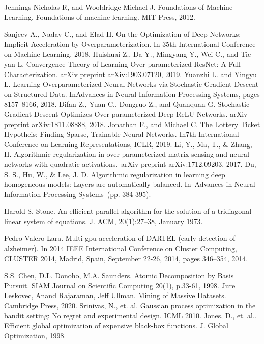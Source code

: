 \begin{thebibliography}{1}
  Jennings Nicholas R, and Wooldridge Michael J. Foundations of Machine Learning. Foundations of machine learning. MIT Press, 2012.

  Sanjeev A., Nadav C., and    Elad H. On the Optimization of Deep Networks: Implicit Acceleration by Overparameterization. In 35th International Conference on Machine Learning, 2018.
  Huishuai Z., Da Y., Mingyang Y., Wei C., and Tie-yan L. Convergence Theory of Learning Over-parameterized ResNet: A Full Characterization. arXiv preprint arXiv:1903.07120, 2019.
  Yuanzhi L. and Yingyu L. Learning Overparameterized Neural Networks via Stochastic Gradient Descent on Structured Data. InAdvances in Neural Information Processing Systems, pages 8157–8166, 2018.
  Difan Z., Yuan C., Dongruo Z., and Quanquan G. Stochastic Gradient Descent Optimizes Over-parameterized Deep ReLU Networks. arXiv preprint arXiv:1811.08888, 2018.
  Jonathan F., and Michael C. The Lottery Ticket Hypotheis: Finding Sparse, Trainable Neural Networks. In7th International Conference on Learning Representations, ICLR, 2019.
  Li, Y., Ma, T., \& Zhang, H. Algorithmic regularization in over-parameterized matrix sensing and neural networks with quadratic activations. arXiv preprint arXiv:1712.09203, 2017.
  Du, S. S., Hu, W., \& Lee, J. D. Algorithmic regularization in learning deep homogeneous models: Layers are automatically balanced. In Advances in Neural Information Processing Systems (pp. 384-395).
  
  Harold S. Stone. An efficient parallel algorithm for the solution of a tridiagonal linear system of
  equations. J. ACM, 20(1):27–38, January 1973.
  
  Pedro Valero-Lara. Multi-gpu acceleration of DARTEL (early detection of alzheimer). In 2014
  IEEE International Conference on Cluster Computing, CLUSTER 2014, Madrid, Spain, September
  22-26, 2014, pages 346–354, 2014.
  
  S.S. Chen, D.L. Donoho, M.A. Saunders. Atomic Decomposition by Basis Pursuit. SIAM Journal on Scientific Computing 20(1), p.33-61, 1998.
  Jure Leskovec, Anand Rajaraman, Jeff Ullman. Mining of Massive Datasets. Cambridge Press, 2020.
  Srinivas, N., et. al. Gaussian process optimization in the bandit setting: No regret and experimental design. ICML 2010.
  Jones, D., et. al., Efficient global optimization of expensive black-box functions. J. Global Optimization, 1998.


\end{thebibliography}
